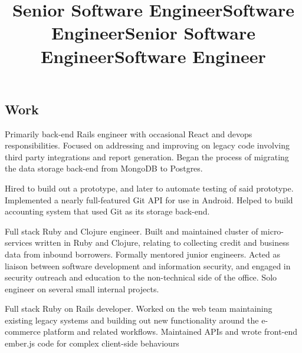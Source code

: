 \documentclass[margin,line,letterpaper]{resume}
\begin{document}
\begin{resume}
  \section{\mysidestyle Work}

  \title{\bf Senior Software Engineer}
  \location{}
  \begin{position}
    Primarily back-end Rails engineer with occasional React and
    devops responsibilities. Focused on addressing and improving on
    legacy code involving third party integrations and report
    generation. Began the process of migrating the data storage
    back-end from MongoDB to Postgres.
  \end{position}

  \title{\bf Software Engineer}
  \location{}
  \begin{position}
    Hired to build out a prototype, and later to automate testing of
    said prototype. Implemented a nearly full-featured Git API for use
    in Android. Helped to build accounting system that used Git as
    its storage back-end.
  \end{position}

  \title{\bf Senior Software Engineer}
  \location{}
  \begin{position}
    Full stack Ruby and Clojure engineer. Built and maintained
    cluster of micro-services written in Ruby and Clojure, relating
    to collecting credit and business data from inbound borrowers.
    Formally mentored junior engineers. Acted as liaison between
    software development and information security, and engaged in
    security outreach and education to the non-technical side of
    the office. Solo engineer on several small internal projects.
  \end{position}

  \title{\bf Software Engineer}
  \location{}
  \begin{position}
    Full stack Ruby on Rails developer. Worked on the web team
    maintaining existing legacy systems and building out new
    functionality around the e-commerce platform and related
    workflows. Maintained APIs and wrote front-end ember.js code
    for complex client-side behaviours
  \end{position}
\end{resume}
\end{document}

